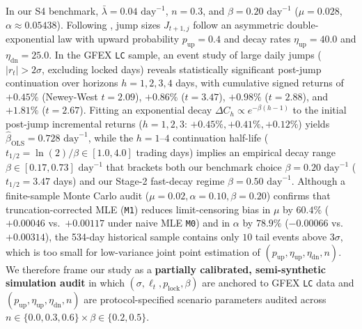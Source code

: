 \documentclass[11pt,a4paper]{article}
\begin{document}
In our S4 benchmark, $\bar{\lambda} = 0.04\text{ day}^{-1}$, $n = 0.3$, and $\beta = 0.20\text{ day}^{-1}$ ($\mu = 0.028$, $\alpha \approx 0.05438$). Following \citet{Kou2002}, jump sizes $J_{t+1,j}$ follow an asymmetric double-exponential law with upward probability $p_{\text{up}} = 0.4$ and decay rates $\eta_{\text{up}} = 40.0$ and $\eta_{\text{dn}} = 25.0$. In the GFEX \texttt{LC} sample, an event study of large daily jumps ($|r_t| > 2\sigma$, excluding locked days) reveals statistically significant post-jump continuation over horizons $h = 1, 2, 3, 4$ days, with cumulative signed returns of $+0.45\%$ (Newey-West $t = 2.09$), $+0.86\%$ ($t = 3.47$), $+0.98\%$ ($t = 2.88$), and $+1.81\%$ ($t = 2.67$). Fitting an exponential decay $\Delta C_h \propto e^{-\beta(h-1)}$ to the initial post-jump incremental returns ($h = 1, 2, 3$: $+0.45\%, +0.41\%, +0.12\%$) yields $\hat{\beta}_{\text{OLS}} = 0.728\text{ day}^{-1}$, while the $h = 1\text{--}4$ continuation half-life ($t_{1/2} = \ln(2)/\beta \in [1.0, 4.0]$ trading days) implies an empirical decay range $\beta \in [0.17, 0.73]\text{ day}^{-1}$ that brackets both our benchmark choice $\beta = 0.20\text{ day}^{-1}$ ($t_{1/2} = 3.47$ days) and our Stage-2 fast-decay regime $\beta = 0.50\text{ day}^{-1}$. Although a finite-sample Monte Carlo audit ($\mu = 0.02, \alpha = 0.10, \beta = 0.20$) confirms that truncation-corrected MLE (\texttt{M1}) reduces limit-censoring bias in $\mu$ by $60.4\%$ ($+0.00046$ vs.\ $+0.00117$ under naive MLE \texttt{M0}) and in $\alpha$ by $78.9\%$ ($-0.00066$ vs.\ $+0.00314$), the 534-day historical sample contains only $10$ tail events above $3\sigma$, which is too small for low-variance joint point estimation of $(p_{\text{up}}, \eta_{\text{up}}, \eta_{\text{dn}}, n)$. We therefore frame our study as a \textbf{partially calibrated, semi-synthetic simulation audit} in which $(\sigma, \ell_t, p_{\text{lock}}, \beta)$ are anchored to GFEX \texttt{LC} data and $(p_{\text{up}}, \eta_{\text{up}}, \eta_{\text{dn}}, n)$ are protocol-specified scenario parameters audited across $n \in \{0.0, 0.3, 0.6\} \times \beta \in \{0.2, 0.5\}$.
\end{document}
